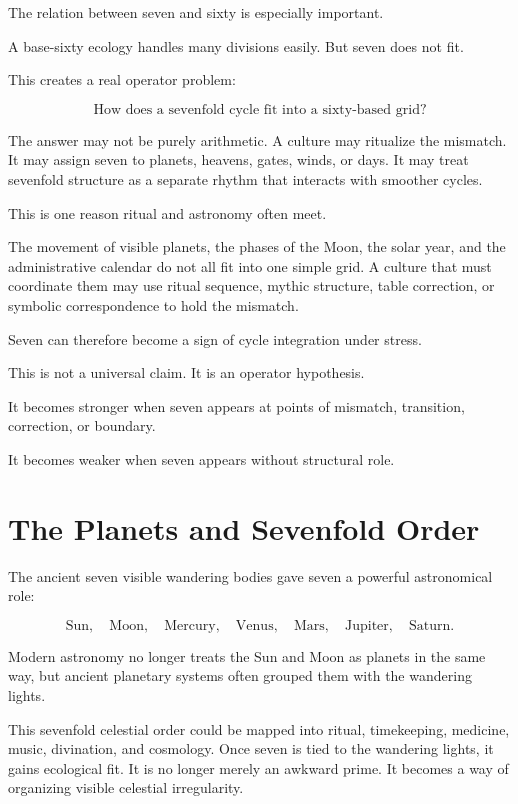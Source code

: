 \documentclass[11pt]{book}
\begin{document}
The relation between seven and sixty is especially important.

A base-sixty ecology handles many divisions easily. But seven does not fit.

This creates a real operator problem:

\[
\text{How does a sevenfold cycle fit into a sixty-based grid?}
\]

The answer may not be purely arithmetic. A culture may ritualize the mismatch. It may assign seven to planets, heavens, gates, winds, or days. It may treat sevenfold structure as a separate rhythm that interacts with smoother cycles.

This is one reason ritual and astronomy often meet.

The movement of visible planets, the phases of the Moon, the solar year, and the administrative calendar do not all fit into one simple grid. A culture that must coordinate them may use ritual sequence, mythic structure, table correction, or symbolic correspondence to hold the mismatch.

Seven can therefore become a sign of cycle integration under stress.

This is not a universal claim. It is an operator hypothesis.

It becomes stronger when seven appears at points of mismatch, transition, correction, or boundary.

It becomes weaker when seven appears without structural role.

\section{The Planets and Sevenfold Order}

The ancient seven visible wandering bodies gave seven a powerful astronomical role:

\[
\text{Sun},
\quad
\text{Moon},
\quad
\text{Mercury},
\quad
\text{Venus},
\quad
\text{Mars},
\quad
\text{Jupiter},
\quad
\text{Saturn}.
\]

Modern astronomy no longer treats the Sun and Moon as planets in the same way, but ancient planetary systems often grouped them with the wandering lights.

This sevenfold celestial order could be mapped into ritual, timekeeping, medicine, music, divination, and cosmology. Once seven is tied to the wandering lights, it gains ecological fit. It is no longer merely an awkward prime. It becomes a way of organizing visible celestial irregularity.
\end{document}

